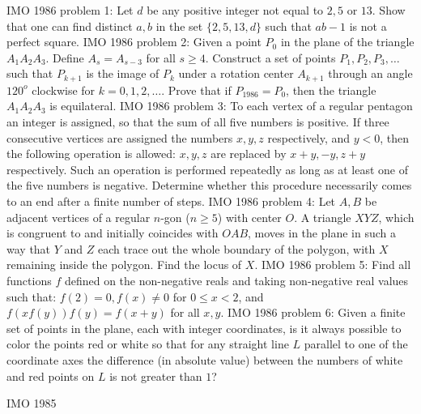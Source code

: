 IMO 1986 problem 1:  Let $d$ be any positive integer not equal to $2, 5$ or $13$. Show that one can find distinct $a,b$ in the set $\{2,5,13,d\}$ such that $ab-1$ is not a perfect square. 
IMO 1986 problem 2:  Given a point $P_0$ in the plane of the triangle $A_1A_2A_3$. Define  $A_s=A_{s-3}$ for all $s\ge4$. Construct a set of points $P_1,P_2,P_3,\ldots$ such that $P_{k+1}$ is the image of $P_k$ under a rotation center $A_{k+1}$ through an angle $120^o$ clockwise for $k=0,1,2,\ldots$. Prove that if $P_{1986}=P_0$, then the triangle $A_1A_2A_3$ is equilateral. 
IMO 1986 problem 3:  To each vertex of a regular pentagon an integer is assigned, so that the sum of all five numbers is positive. If three consecutive vertices are assigned the numbers $x,y,z$ respectively, and $y<0$, then the following operation is allowed: $x,y,z$ are replaced by $x+y,-y,z+y$ respectively. Such an operation is performed repeatedly as long as at least one of the five numbers is negative. Determine whether this procedure necessarily comes to an end after a finite number of steps. 
IMO 1986 problem 4:  Let $A,B$ be adjacent vertices of a regular $n$-gon ($n\ge5$) with center $O$. A triangle $XYZ$, which is congruent to and initially coincides with $OAB$, moves in the plane in such a way that $Y$ and $Z$ each trace out the whole boundary of the polygon, with $X$ remaining inside the polygon. Find the locus of $X$. 
IMO 1986 problem 5:  Find all functions $f$ defined on the non-negative reals and taking non-negative real values such that: $f(2)=0,f(x)\ne0$ for $0\le x<2$, and $f(xf(y))f(y)=f(x+y)$ for all $x,y$. 
IMO 1986 problem 6:  Given a finite set of points in the plane, each with integer coordinates, is it always possible to color the points red or white so that for any straight line $L$ parallel to one of the coordinate axes the difference (in absolute value) between the numbers of white and red points on $L$ is not greater than $1$? 

IMO 1985 

